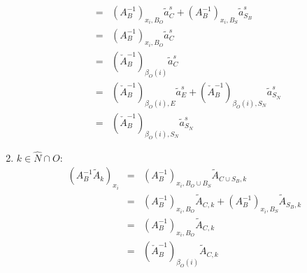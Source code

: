 \documentclass[a4paper]{article}
\begin{document}
\begin{enumerate}
\begin{eqnarray}
  \nonumber \\
  &=&
  (A_{B}^{-1})_{x_{i}, B_{O}}\tilde{a}_{C}^{s} +
  (A_{B}^{-1})_{x_{i}, B_{S}}\tilde{a}_{S_{B}}^{s} 
  \nonumber \\
  &=&
  (A_{B}^{-1})_{x_{i}, B_{O}}\tilde{a}_{C}^{s}
  \nonumber \\
  &=&
  \left(\check{A}_{B}^{-1}\right)_{\beta_{O}(i)}\tilde{a}_{C}^{s} 
  \nonumber \\
  &=&
  \left(\check{A}_{B}^{-1}\right)_{\beta_{O}(i), E}\tilde{a}_{E}^{s}
  +\left(\check{A}_{B}^{-1}\right)_{\beta_{O}(i), S_{N}}\tilde{a}_{S_{N}}^{s}
  \nonumber \\
  &=&
  \left(\check{A}_{B}^{-1}\right)_{\beta_{O}(i), S_{N}}\tilde{a}_{S_N}^{s}
\end{eqnarray}
\item $k \in \hat{N} \cap O$:
\begin{eqnarray}
  (A_{B}^{-1}\tilde{A}_{k})_{x_{i}} &=&
  (A_{B}^{-1})_{x_{i}, B_{O} \cup B_{S}}\tilde{A}_{C \cup S_{B}, k}
  \nonumber \\
  &=&
  (A_{B}^{-1})_{x_{i}, B_{O}}\tilde{A}_{C, k} +
  (A_{B}^{-1})_{x_{i}, B_{S}}\tilde{A}_{S_{B}, k}
  \nonumber \\
  &=&
  (A_{B}^{-1})_{x_{i}, B_{O}}\tilde{A}_{C, k}
  \nonumber \\  
  &=&
  \left(\check{A}_{B}^{-1}\right)_{\beta_{O}(i)}\tilde{A}_{C,k} 
\end{eqnarray}
\end{enumerate}
\end{document}
